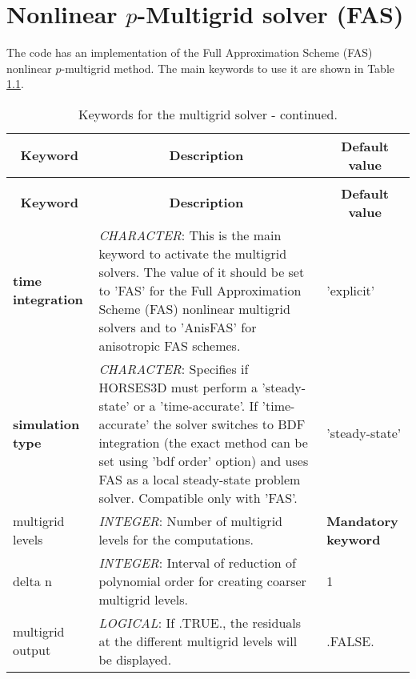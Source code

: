 \documentclass[a4paper,10pt]{report}
\begin{document}


\chapter{Nonlinear $p$-Multigrid solver (FAS)}

The code has an implementation of the Full Approximation Scheme (FAS) nonlinear $p$-multigrid method. The main keywords to use it are shown in Table \ref{tab:multigridKey}.

\begin{longtable}{|p{4cm}|p{10cm}|p{2.2cm}|}
\caption{Keywords for the multigrid solver.} \label{tab:multigridKey} \\
\hline
\multicolumn{1}{|c|}{\textbf{Keyword}} & \multicolumn{1}{c|}{\textbf{Description}} & \multicolumn{1}{c|}{\textbf{Default value}} \\ \hline
\endfirsthead

\caption{Keywords for the multigrid solver - continued.} \\
\hline
\multicolumn{1}{|c|}{\textbf{Keyword}} & \multicolumn{1}{c|}{\textbf{Description}} & \multicolumn{1}{c|}{\textbf{Default value}} \\ \hline
\endhead

\textbf{time integration} & \textit{CHARACTER}: This is the main keyword to activate the multigrid solvers. The value of it should be set to 'FAS' for the Full Approximation Scheme (FAS) nonlinear multigrid  solvers and to 'AnisFAS' for anisotropic FAS schemes. & 'explicit' \\ \hline

\textbf{simulation type} & \textit{CHARACTER}: Specifies if HORSES3D must perform a ’steady-state’ or a ’time-accurate’. If 'time-accurate' the solver switches to BDF integration (the exact method can be set using 'bdf order' option) and uses FAS as a local steady-state problem solver. Compatible only with 'FAS'. & 'steady-state' \\ \hline

multigrid levels & \textit{INTEGER}: Number of multigrid levels for the computations. & \textbf{Mandatory keyword} \\ \hline

delta n          & \textit{INTEGER}: Interval of reduction of polynomial order for creating coarser multigrid levels.& 1 \\ \hline

multigrid output & \textit{LOGICAL}: If .TRUE., the residuals at the different multigrid levels will be displayed. & .FALSE. \\ \hline


\end{longtable}
\end{document}
